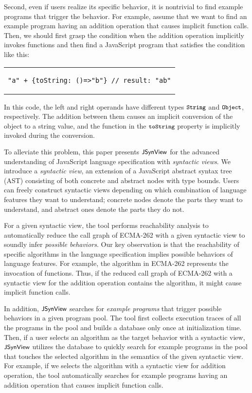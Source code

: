 Second, even if users realize its specific behavior, it is nontrivial to find
example programs that trigger the behavior.  For example, assume that we want to
find an example program having an addition operation that causes implicit
function calls.  Then, we should first grasp the condition when the addition
operation implicitly invokes functions and then find a JavaScript program that
satisfies the condition like this:
\begin{center}
  \begin{tabular}{c}
    \begin{lstlisting}[style=JS]
"a" + {toString: ()=>"b"} // result: "ab"
    \end{lstlisting}
  \end{tabular}
\end{center}
In this code, the left and right operands have different types ${\small \texttt{String}}$
and ${\small \texttt{Object}}$, respectively.  The addition between them causes an
implicit conversion of the object to a string value, and the function in the
${\small \texttt{toString}}$ property is implicitly invoked during the conversion.

To alleviate this problem, this paper presents $\textsf{\small JSynView}$ for the advanced
understanding of JavaScript language specification with \textit{syntactic
views}.  We introduce a \textit{syntactic view}, an extension of a JavaScript
abstract syntax tree (AST) consisting of both concrete and abstract nodes with
type bounds.  Users can freely construct syntactic views depending on
which combination of language features they want to understand; concrete nodes
denote the parts they want to understand, and abstract ones denote the parts
they do not.

For a given syntactic view, the tool performs reachability analysis to
automatically reduce the call graph of ECMA-262 with a given syntactic view to
soundly infer \textit{possible behaviors}.  Our key observation is that the
reachability of specific algorithms in the language specification implies
possible behaviors of language features.  For example, the 
algorithm in ECMA-262 represents the invocation of functions.  Thus, if the
reduced call graph of ECMA-262 with a syntactic view for the addition operation
contains the  algorithm, it might cause implicit function calls.

In addition, $\textsf{\small JSynView}$ searches for \textit{example programs} that trigger
possible behaviors in a given program pool.  The tool first collects execution
traces of all the programs in the pool and builds a database only once at
initialization time.  Then, if a user selects an algorithm as the target
behavior with a syntactic view, $\textsf{\small JSynView}$ utilizes the database to quickly search for
example programs in the pool that touches the selected algorithm in the
semantics of the given syntactic view.  For example, if we selects the
 algorithm with a syntactic view for addition operation, the tool
automatically searches for example programs having an addition operation that
causes implicit function calls.

